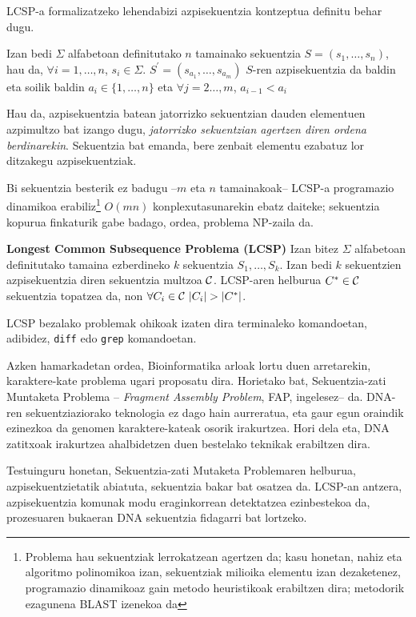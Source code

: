 \documentclass[eu]{ifirak}\usepackage[]{graphicx}\usepackage[]{color}
\begin{document}
LCSP-a formalizatzeko lehendabizi azpisekuentzia kontzeptua definitu behar dugu.

\begin{ifdefinition}
Izan bedi $\Sigma$ alfabetoan definitutako $n$ tamainako sekuentzia $S=(s_1,\ldots,s_n)$, hau da, $\forall i=1,\ldots,n$, $s_i\in \Sigma$. $S^\prime=(s_{a_1},\ldots,s_{a_m})$ $S$-ren azpisekuentzia da baldin eta soilik baldin $a_i\in\{1,\ldots,n\}$ eta $\forall j=2\ldots,m$, $a_{i-1}<a_i$
\end{ifdefinition}

Hau da, azpisekuentzia batean jatorrizko sekuentzian dauden elementuen azpimultzo bat izango dugu, \textit{jatorrizko sekuentzian agertzen diren ordena berdinarekin}. Sekuentzia bat emanda, bere zenbait elementu ezabatuz lor ditzakegu azpisekuentziak.

Bi sekuentzia besterik ez badugu --$m$ eta $n$ tamainakoak-- LCSP-a programazio dinamikoa erabiliz\footnote{Problema hau sekuentziak lerrokatzean agertzen da; kasu honetan, nahiz eta algoritmo polinomikoa izan, sekuentziak milioika elementu izan dezaketenez, programazio dinamikoaz gain metodo heuristikoak erabiltzen dira; metodorik ezagunena BLAST\citep{altschul1990} izenekoa da} $O(mn)$ konplexutasunarekin ebatz daiteke; sekuentzia kopurua finkaturik gabe badago, ordea, problema NP-zaila da.

\begin{ifdefinition}{\bf Longest Common Subsequence Problema (LCSP)}
Izan bitez $\Sigma$ alfabetoan definitutako tamaina ezberdineko $k$ sekuentzia $S_1,\ldots,S_k$. Izan bedi $k$ sekuentzien azpisekuentzia diren sekuentzia multzoa $\cal C$. LCSP-aren helburua $C^*\in{\cal C}$ sekuentzia topatzea da, non $\forall C_i\in{\cal C}\ |C_i|>|C^*|$.
\end{ifdefinition}

LCSP bezalako problemak ohikoak izaten dira terminaleko komandoetan, adibidez, \texttt{diff} edo \texttt{grep} komandoetan.

Azken hamarkadetan ordea, Bioinformatika arloak lortu duen arretarekin, karaktere-kate problema ugari proposatu dira. Horietako bat, Sekuentzia-zati Muntaketa Problema -- \textit{Fragment Assembly Problem}, FAP, ingelesez-- da. DNA-ren sekuentziaziorako teknologia ez dago hain aurreratua, eta gaur egun oraindik ezinezkoa da genomen karaktere-kateak osorik irakurtzea. Hori dela eta, DNA zatitxoak irakurtzea ahalbidetzen duen bestelako teknikak erabiltzen dira.

Testuinguru honetan, Sekuentzia-zati Mutaketa Problemaren helburua, azpisekuentzietatik abiatuta, sekuentzia bakar bat osatzea da. LCSP-an antzera, azpisekuentzia komunak modu eraginkorrean detektatzea ezinbestekoa da, prozesuaren bukaeran DNA sekuentzia fidagarri bat lortzeko.
\end{document}
